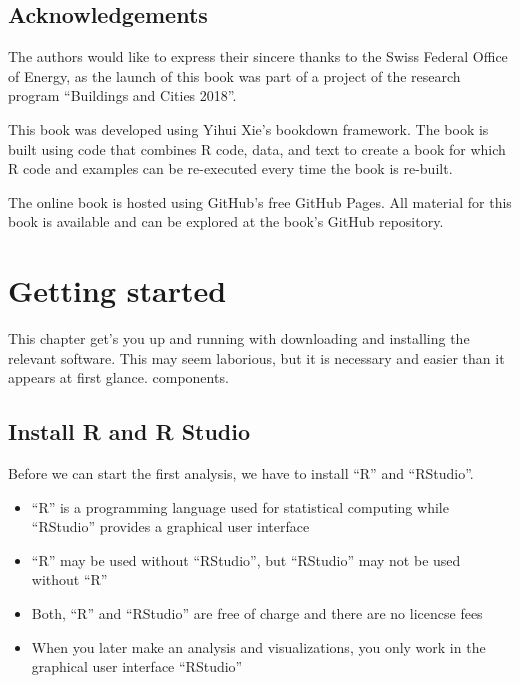 \documentclass[
]{book}
\providecommand{\tightlist}{%
  \setlength{\itemsep}{0pt}\setlength{\parskip}{0pt}}
\begin{document}
\hypertarget{acknowledgements}{%
\section{Acknowledgements}\label{acknowledgements}}

The authors would like to express their sincere thanks to the Swiss Federal Office of Energy, as the launch of this book was part of a project of the research program ``Buildings and Cities 2018''.

This book was developed using Yihui Xie's bookdown framework. The book is built using code that combines R code, data, and text to create a book for which R code and examples can be re-executed every time the book is re-built.

The online book is hosted using GitHub's free GitHub Pages. All material for this book is available and can be explored at the book's GitHub repository.

\hypertarget{getting-started}{%
\chapter{Getting started}\label{getting-started}}

This chapter get's you up and running with downloading and installing the relevant software. This may seem laborious, but it is necessary and easier than it appears at first glance. components.

\hypertarget{installation}{%
\section{Install R and R Studio}\label{installation}}

Before we can start the first analysis, we have to install ``R'' and ``RStudio''.

\begin{itemize}
\tightlist
\item
  ``R'' is a programming language used for statistical computing while ``RStudio'' provides a graphical user interface
\item
  ``R'' may be used without ``RStudio'', but ``RStudio'' may not be used without ``R''
\item
  Both, ``R'' and ``RStudio'' are free of charge and there are no licencse fees
\item
  When you later make an analysis and visualizations, you only work in the graphical user interface ``RStudio''
\end{itemize}
\end{document}
